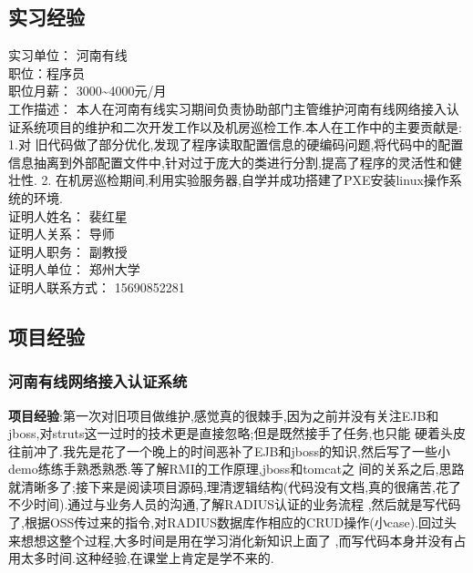 \documentclass[11pt]{ctexart}
\begin{document}
\subsection{实习经验}
\label{sec-1-5}
实习单位： 河南有线\\
职位：程序员\\
职位月薪： 3000\textasciitilde{}4000元/月\\
工作描述： 本人在河南有线实习期间负责协助部门主管维护河南有线网络接入认证系统项目的维护和二次开发工作以及机房巡检工作.本人在工作中的主要贡献是: 1.对
旧代码做了部分优化,发现了程序读取配置信息的硬编码问题,将代码中的配置信息抽离到外部配置文件中,针对过于庞大的类进行分割,提高了程序的灵活性和健壮性. 2.
在机房巡检期间,利用实验服务器,自学并成功搭建了PXE安装linux操作系统的环境.\\
证明人姓名： 裴红星\\
证明人关系： 导师\\
证明人职务： 副教授\\
证明人单位： 郑州大学\\
证明人联系方式： 15690852281\\
\subsection{项目经验}
\label{sec-1-6}
\subsubsection{河南有线网络接入认证系统}
\label{sec-1-6-1}
\textbf{项目经验}:第一次对旧项目做维护,感觉真的很棘手,因为之前并没有关注EJB和jboss,对struts这一过时的技术更是直接忽略;但是既然接手了任务,也只能
硬着头皮往前冲了.我先是花了一个晚上的时间恶补了EJB和jboss的知识,然后写了一些小demo练练手熟悉熟悉.等了解RMI的工作原理,jboss和tomcat之
间的关系之后,思路就清晰多了;接下来是阅读项目源码,理清逻辑结构(代码没有文档,真的很痛苦,花了不少时间).通过与业务人员的沟通,了解RADIUS认证的业务流程
,然后就是写代码了,根据OSS传过来的指令,对RADIUS数据库作相应的CRUD操作(小case).回过头来想想这整个过程,大多时间是用在学习消化新知识上面了
,而写代码本身并没有占用太多时间.这种经验,在课堂上肯定是学不来的.
\end{document}
